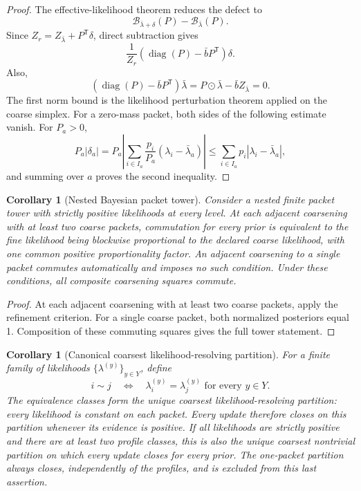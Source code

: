 \documentclass[11pt,a4paper]{article}
\newtheorem{corollary}[theorem]{Corollary}
\theoremstyle{definition}
\theoremstyle{remark}
\newcommand{\cB}{\mathcal B}
\newcommand{\diag}{\operatorname{diag}}
\begin{document}
\begin{proof}
The effective-likelihood theorem reduces the defect to
\[
\cB_{\bar\lambda+\delta}(P)-\cB_{\bar\lambda}(P).
\]
Since $Z_r=Z_{\bar\lambda}+P^{\mathsf T}\delta$, direct subtraction gives
\[
\frac{1}{Z_r}
\left(\diag(P)-\bar bP^{\mathsf T}\right)\delta.
\]
Also,
\[
\left(\diag(P)-\bar bP^{\mathsf T}\right)\bar\lambda
=P\odot\bar\lambda-\bar bZ_{\bar\lambda}=0.
\]
The first norm bound is the likelihood perturbation theorem applied on the coarse simplex. For a zero-mass packet, both sides of the following estimate vanish. For $P_a>0$,
\[
P_a|\delta_a|
=
P_a\left|\sum_{i\in I_a}\frac{p_i}{P_a}
(\lambda_i-\bar\lambda_a)\right|
\le
\sum_{i\in I_a}p_i|\lambda_i-\bar\lambda_a|,
\]
and summing over $a$ proves the second inequality.
\end{proof}

\begin{corollary}[Nested Bayesian packet tower]\label{core:record:024}
Consider a nested finite packet tower with strictly positive likelihoods at every level. At each adjacent coarsening with at least two coarse packets, commutation for every prior is equivalent to the fine likelihood being blockwise proportional to the declared coarse likelihood, with one common positive proportionality factor. An adjacent coarsening to a single packet commutes automatically and imposes no such condition. Under these conditions, all composite coarsening squares commute.
\end{corollary}

\begin{proof}
At each adjacent coarsening with at least two coarse packets, apply the refinement criterion. For a single coarse packet, both normalized posteriors equal 1. Composition of these commuting squares gives the full tower statement.
\end{proof}

\begin{corollary}[Canonical coarsest likelihood-resolving partition]\label{core:record:025}
For a finite family of likelihoods $\{\lambda^{(y)}\}_{y\in Y}$, define
\[
i\sim j
\quad\Longleftrightarrow\quad
\lambda_i^{(y)}=\lambda_j^{(y)}
\text{ for every }y\in Y.
\]
The equivalence classes form the unique coarsest likelihood-resolving partition: every likelihood is constant on each packet. Every update therefore closes on this partition whenever its evidence is positive. If all likelihoods are strictly positive and there are at least two profile classes, this is also the unique coarsest nontrivial partition on which every update closes for every prior. The one-packet partition always closes, independently of the profiles, and is excluded from this last assertion.
\end{corollary}
\end{document}
